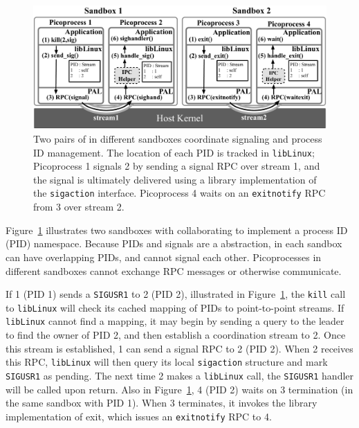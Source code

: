 \begin{figure}
\centering
\includegraphics[width=6in]{graphene/figures/coordination.pdf}
\caption[Sandboxing inter-process cordination in \graphene{}]
{Two pairs of \graphene{} \picoprocs{} in different sandboxes 
coordinate signaling and process ID management.
The location of each PID is tracked in {\tt libLinux}; Picoprocess 1 signals
\picoproc{} 2 by sending a signal RPC over stream 1,
and the signal is ultimately delivered using a 
library implementation of the {\tt sigaction} interface. Picoprocess 4 
waits on an {\tt exitnotify} RPC from  \picoproc{} 3 over stream 2. }
\label{fig:graphene:coordination}
\end{figure}

Figure~\ref{fig:graphene:coordination} illustrates two sandboxes with \picoprocs{}
collaborating to implement a process ID (PID) namespace.  
Because PIDs and signals are a \libos{} abstraction,
\picoprocs{} in 
each sandbox can have overlapping PIDs, and
cannot signal each other.
Picoprocesses in different sandboxes cannot 
exchange RPC messages or otherwise communicate.


If \picoproc{} 1 (PID 1) sends a {\tt SIGUSR1} to \picoproc{} 2 (PID 2), illustrated in Figure~\ref{fig:graphene:coordination},
the {\tt kill} call to {\tt libLinux} will check its cached mapping of PIDs to 
point-to-point streams.
If {\tt libLinux} cannot find a mapping, it may begin by sending a query to the leader
to find the owner of PID 2,
and then establish a coordination stream to \picoproc{} 2.
Once this stream is established, \picoproc{} 1 can send a  
signal RPC to \picoproc{} 2 (PID 2).
When \picoproc{} 2 receives this RPC, 
{\tt libLinux} will then query its local {\tt sigaction} 
structure and mark {\tt SIGUSR1} as pending.
The next time \picoproc{} 2 makes a {\tt libLinux} call,
the {\tt SIGUSR1} handler will be called upon return. Also in Figure~\ref{fig:graphene:coordination}, \picoproc{} 4 (PID 2) waits on 
\picoproc{} 3 termination (in the same sandbox with PID 1). When \picoproc{} 3 terminates, it invokes the library implementation of exit, which issues
an {\tt exitnotify} RPC to \picoproc{} 4.

